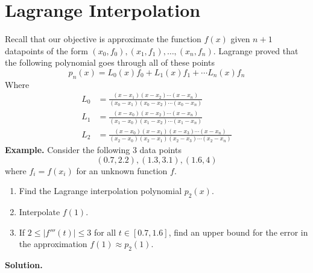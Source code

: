 \documentclass[openany]{report}
\begin{document}
\section{Lagrange Interpolation}
Recall that our objective is approximate the function $f(x)$ given $n+1$ datapoints of the form $(x_0, f_0), (x_1,f_1), \ldots, (x_n,f_n)$. Lagrange proved that the following polynomial goes through all of these points 
\[p_n(x) = L_0(x)f_0 + L_1(x)f_1 + \cdots L_n(x)f_n\]
Where 
\begin{align*}
    L_0 &= \frac{(x-x_1)(x-x_2)\cdots(x-x_n)}{(x_0-x_1)(x_0-x_2)\cdots(x_0-x_n)}  \\
    L_1 &= \frac{(x-x_0)(x-x_2)\cdots(x-x_n)}{(x_1-x_0)(x_1-x_2)\cdots(x_1-x_n)}\\
    L_2 &= \frac{(x-x_0)(x-x_1)(x-x_3)\cdots(x-x_n)}{(x_2-x_0)(x_2-x_1)(x_2-x_3)\cdots(x_2-x_n)}
\end{align*}
\noindent
\textbf{Example.} Consider the following 3 data points 
\[(0.7, 2.2),(1.3,3.1),(1.6,4)\]
where $f_i = f(x_i)$ for an unknown function $f$. 
\begin{enumerate}[label=(\roman*)]
    \item Find the Lagrange interpolation polynomial $p_2(x)$. 
    \item Interpolate $f(1)$. 
    \item If $2 \leq |f'''(t)| \leq 3$ for all $t \in [0.7, 1.6]$, find an upper bound for the error in the approximation $f(1) \approx p_2(1)$.
\end{enumerate}
\textbf{Solution.} 
\end{document}
